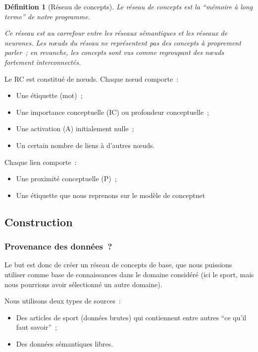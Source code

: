 \documentclass{article}           %
\newtheorem{definition}{D\'efinition}
\begin{document}
\begin{definition}[Réseau de concepts]
  Le réseau de concepts est la ``mémoire à long terme'' de notre programme.

Ce réseau est au carrefour entre les réseaux sémantiques et les réseaux de neurones. Les n\oe{}uds du réseau ne représentent pas des concepts à proprement parler~; en revanche, les concepts sont vus comme regroupant des n\oe{}uds fortement interconnectés.
\end{definition}

Le RC est constitué de n\oe{}uds. Chaque n\oe{}ud comporte~:
\begin{itemize}
  \item Une étiquette (mot)~;
 \item Une importance conceptuelle (IC) ou profondeur conceptuelle~;
 \item Une activation (A) initialement nulle~;
 \item Un certain nombre de liens à d'autres n\oe{}uds.
\end{itemize}

Chaque lien comporte~:
\begin{itemize}
 \item Une proximité conceptuelle (P)~;
 \item Une étiquette que nous reprenons sur le modèle de conceptnet
\end{itemize}

\subsection{Construction}

\subsubsection{Provenance des données~?}

Le but est donc de créer un réseau de concepts de base, que nous puissions utiliser comme base de connaissances dans le domaine considéré (ici le sport, mais nous pourrions avoir sélectionné un autre domaine).

Nous utilisons deux types de sources~:
\begin{itemize}
 \item Des articles de sport (données brutes) qui contiennent entre autres ``ce qu'il faut savoir''~;
 \item Des données sémantiques libres.
\end{itemize}
\end{document}
